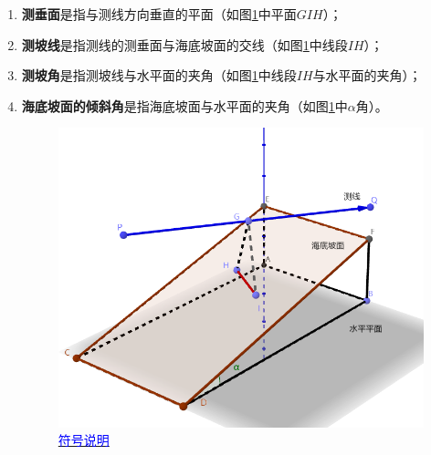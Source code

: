 \begin{enumerate}
    \item \textbf{测垂面}是指与测线方向垂直的平面（如图\ref{fig:符号说明}中平面$GIH$）；
    \item \textbf{测坡线}是指测线的测垂面与海底坡面的交线（如图\ref{fig:符号说明}中线段$IH$）；
    \item \textbf{测坡角}是指测坡线与水平面的夹角（如图\ref{fig:符号说明}中线段$IH$与水平面的夹角）；
    \item \textbf{海底坡面的倾斜角}是指海底坡面与水平面的夹角（如图\ref{fig:符号说明}中$\alpha$角）。\newline

    \begin{figure}[h]
        \centering
        \includegraphics[scale=0.4]{res/img/符号说明.png}
        \caption{\href{https://www.geogebra.org/m/ftk9cu9v}{\textcolor{blue}{符号说明}}}
        \label{fig:符号说明}
    \end{figure}
    
\end{enumerate}



